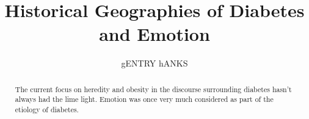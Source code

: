 \documentclass[12pt]{article}
\title{Historical Geographies of Diabetes and Emotion}
\author{gENTRY hANKS}
\begin{document}
\maketitle


\newpage
\begin{abstract}
\doublespacing 
The current focus on heredity and obesity in the discourse surrounding diabetes hasn't always had the lime light. Emotion was once very much considered as part of the etiology of diabetes. 
\end{abstract}





%
%
\end{document}
